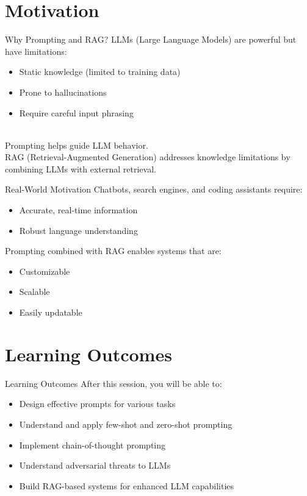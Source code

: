 \section{Motivation}
\begin{frame}{Why Prompting and RAG?}
    LLMs (Large Language Models) are powerful but have limitations:
    \begin{itemize}
        \item Static knowledge (limited to training data)
        \item Prone to hallucinations
        \item Require careful input phrasing
    \end{itemize}
    \\[2em]
    Prompting helps guide LLM behavior. \\[2em]

    RAG (Retrieval-Augmented Generation) addresses knowledge limitations by combining LLMs with external retrieval.
\end{frame}

\begin{frame}{Real-World Motivation}
    Chatbots, search engines, and coding assistants require:
    \begin{itemize}
        \item Accurate, real-time information
        \item Robust language understanding
    \end{itemize}
    \vspace{1em}
    Prompting combined with RAG enables systems that are:
    \begin{itemize}
        \item Customizable
        \item Scalable
        \item Easily updatable
    \end{itemize}
\end{frame}

\section{Learning Outcomes}
\begin{frame}{Learning Outcomes}
    After this session, you will be able to:
    \begin{itemize}
        \setlength{\itemsep}{1em}
        \item Design effective prompts for various tasks
        \item Understand and apply few-shot and zero-shot prompting
        \item Implement chain-of-thought prompting
        \item Understand adversarial threats to LLMs
        \item Build RAG-based systems for enhanced LLM capabilities
    \end{itemize}
\end{frame}


